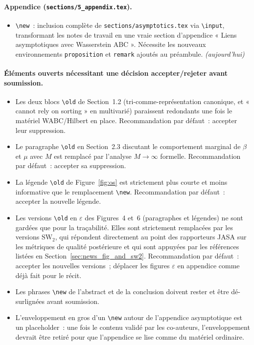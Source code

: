 \documentclass[11pt]{article}
\begin{document}
\paragraph{Appendice (\texttt{sections/5\_appendix.tex}).}
\begin{itemize}[nosep]
    \item \texttt{\textbackslash new}~: inclusion complète de \texttt{sections/asymptotics.tex}
    via \texttt{\textbackslash input}, transformant les notes de travail en une vraie section
    d'appendice « Liens asymptotiques avec Wasserstein ABC ». Nécessite les nouveaux
    environnements \texttt{proposition} et \texttt{remark} ajoutés au préambule.
    \textit{(aujourd'hui)}
\end{itemize}

\paragraph{Éléments ouverts nécessitant une décision accepter/rejeter avant soumission.}
\begin{itemize}[nosep]
    \item Les deux blocs \texttt{\textbackslash old} de Section~1.2 (tri-comme-représentation
    canonique, et « cannot rely on sorting » en multivarié) paraissent redondants une fois le
    matériel WABC/Hilbert en place. Recommandation par défaut~: accepter leur suppression.
    \item Le paragraphe \texttt{\textbackslash old} en Section~2.3 discutant le comportement
    marginal de $\beta$ et $\mu$ avec $M$ est remplacé par l'analyse $M\to\infty$ formelle.
    Recommandation par défaut~: accepter sa suppression.
    \item La légende \texttt{\textbackslash old} de Figure~\ref{fig:os} est strictement plus
    courte et moins informative que le remplacement \texttt{\textbackslash new}. Recommandation
    par défaut~: accepter la nouvelle légende.
    \item Les versions \texttt{\textbackslash old} en $\varepsilon$ des Figures~4 et~6
    (paragraphes et légendes) ne sont gardées que pour la traçabilité. Elles sont strictement
    remplacées par les versions $\mathrm{SW}_2$, qui répondent directement au point des
    rapporteurs JASA sur les métriques de qualité postérieure et qui sont appuyées par les
    références listées en Section~\ref{sec:news_fig_and_sw2}. Recommandation par défaut~:
    accepter les nouvelles versions~; déplacer les figures $\varepsilon$ en appendice comme déjà
    fait pour le récit.
    \item Les phrases \texttt{\textbackslash new} de l'abstract et de la conclusion doivent
    rester et être dé-surlignées avant soumission.
    \item L'enveloppement en gros d'un \texttt{\textbackslash new} autour de l'appendice
    asymptotique est un placeholder~: une fois le contenu validé par les co-auteurs,
    l'enveloppement devrait être retiré pour que l'appendice se lise comme du matériel ordinaire.
\end{itemize}
\fi
\end{document}
